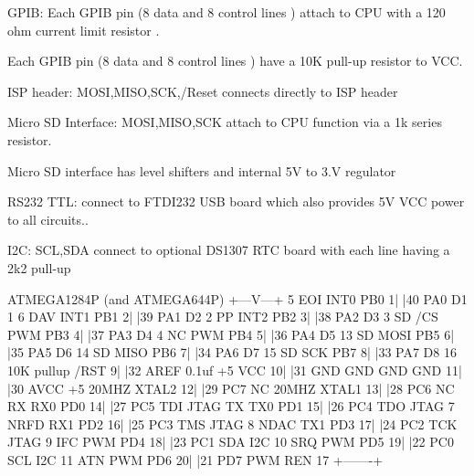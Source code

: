 \begin{DoxyItemize}
\item G\-P\-I\-B\-: Each G\-P\-I\-B pin (8 data and 8 control lines ) attach to C\-P\-U with a 120 ohm current limit resistor .
\begin{DoxyItemize}
\item Each G\-P\-I\-B pin (8 data and 8 control lines ) have a 10\-K pull-\/up resistor to V\-C\-C.
\end{DoxyItemize}
\item I\-S\-P header\-: M\-O\-S\-I,M\-I\-S\-O,S\-C\-K,/\-Reset connects directly to I\-S\-P header
\item Micro S\-D Interface\-: M\-O\-S\-I,M\-I\-S\-O,S\-C\-K attach to C\-P\-U function via a 1k series resistor.
\begin{DoxyItemize}
\item Micro S\-D interface has level shifters and internal 5\-V to 3.\-V regulator
\end{DoxyItemize}
\item R\-S232 T\-T\-L\-: connect to F\-T\-D\-I232 U\-S\-B board which also provides 5\-V V\-C\-C power to all circuits..
\item I2\-C\-: S\-C\-L,S\-D\-A connect to optional D\-S1307 R\-T\-C board with each line having a 2k2 pull-\/up
\end{DoxyItemize}


\begin{DoxyPre}\end{DoxyPre}



\begin{DoxyPre}                       ATMEGA1284P (and ATMEGA644P) 
                       +---V---+ 
     5 EOI INT0  PB0  1|       |40  PA0      D1  1 
     6 DAV INT1  PB1  2|       |39  PA1      D2  2 
       PP  INT2  PB2  3|       |38  PA2      D3  3 
    SD /CS  PWM  PB3  4|       |37  PA3      D4  4 
       NC   PWM  PB4  5|       |36  PA4      D5 13 
    SD     MOSI  PB5  6|       |35  PA5      D6 14 
    SD     MISO  PB6  7|       |34  PA6      D7 15 
    SD      SCK  PB7  8|       |33  PA7      D8 16 
    10K pullup  /RST  9|       |32  AREF     0.1uf 
       +5        VCC 10|       |31  GND      GND   
       GND       GND 11|       |30  AVCC     +5    
    20MHZ      XTAL2 12|       |29  PC7      NC    
    20MHZ      XTAL1 13|       |28  PC6      NC    
       RX   RX0  PD0 14|       |27  PC5  TDI JTAG 
       TX   TX0  PD1 15|       |26  PC4  TDO JTAG 
     7 NRFD RX1  PD2 16|       |25  PC3  TMS JTAG 
     8 NDAC TX1  PD3 17|       |24  PC2  TCK JTAG 
     9 IFC  PWM  PD4 18|       |23  PC1  SDA I2C   
    10 SRQ  PWM  PD5 19|       |22  PC0  SCL I2C  
    11 ATN  PWM  PD6 20|       |21  PD7  PWM REN 17 
                       +-------+ 
\end{DoxyPre}






